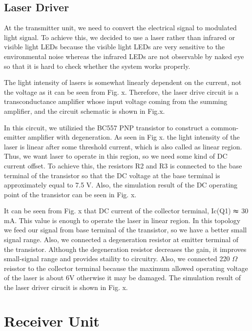 \documentclass[conference]{IEEEtran}
\begin{document}
\subsection{Laser Driver}
At the transmitter unit, we need to convert the electrical signal to modulated light signal. To achieve this, we decided to use a laser rather than infrared or visible light LEDs because the visible light LEDs are very sensitive to the environmental noise whereas the infrared LEDs are not observable by naked eye so that it is hard to check whether the system works properly. \\ 
\par The light intensity of lasers is somewhat linearly dependent on the current, not the voltage as it can be seen from Fig. x. Therefore, the laser drive circuit is a transconductance amplifier whose input voltage coming from the summing amplifier, and the circuit schematic is shown in Fig.x. \\
\par In this circuit, we utilizied the BC557 PNP transistor to construct a common-emitter amplifier with degeneration. As seen in Fig x. the light intensity of the laser is linear after some threshold current, which is also called as linear region. Thus, we want laser to operate in this region, so we need some kind of DC current offset. To achieve this, the resistors R2 and R3 is connected to the base terminal of the transistor so that the DC voltage at the base terminal is approximately equal to 7.5 V. Also, the simulation result of the DC operating point of the transistor can be seen in Fig. x. \\
\par It can be seen from Fig. x that DC current of the collector terminal, Ic(Q1) \(\thickapprox \) 30 mA. This value is enough to operate the laser in linear region. In this topology we feed our signal from base terminal of the transistor, so we have a better small signal range. Also, we connected a degeneration resistor at emitter terminal of the transistor. Although the degeneration resistor decreases the gain, it improves small-signal range and provides staility to circuitry. Also, we connected 220 \(\Omega\) reisstor to the collector terminal because the maximum allowed operating voltage of the laser is about 6V otherwise it may be damaged. The simulation result of the laser driver cirucit is shown in Fig. x.  
\section{Receiver Unit}
\end{document}
